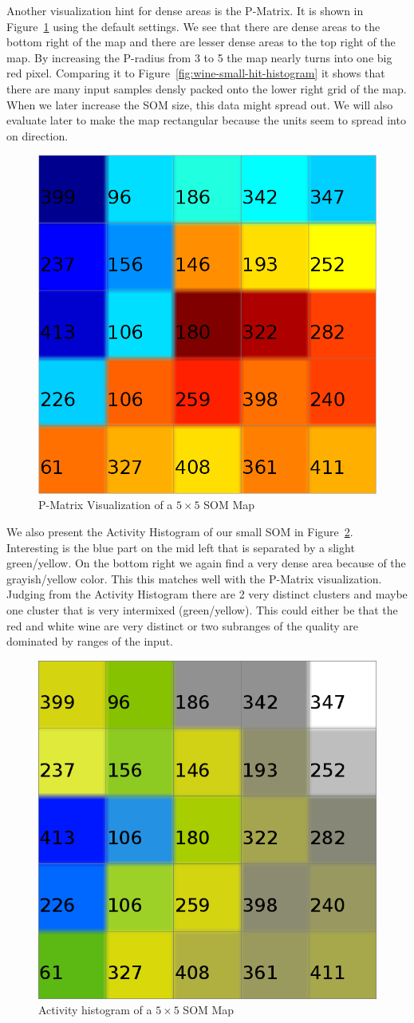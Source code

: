 \documentclass{acm_proc_article-sp}
\begin{document}
Another visualization hint for dense areas is the P-Matrix. It is shown in Figure~\ref{fig:wine-small-p-matrix} using
the default settings. We see that there are dense areas to the bottom right of the map and there are lesser
dense areas to the top right of the map.
By increasing the P-radius from 3 to 5 the map nearly turns into one big red pixel.
Comparing it to Figure~\ref{fig:wine-small-hit-histogram} it shows that there are many input samples densly packed
onto the lower right grid of the map. When we later increase the SOM size, this data might spread out. We
will also evaluate later to make the map rectangular because the units seem to spread into on direction.

\begin{figure}
\centering
\includegraphics[width=0.5\linewidth]{img/wine-small-p-matrix}
\caption{P-Matrix Visualization of a $5\times5$ SOM Map}
\label{fig:wine-small-p-matrix}
\end{figure}

We also present the Activity Histogram of our small SOM in Figure~\ref{fig:wine-small-activity-histogram}.
Interesting is the blue part on the mid left that is separated by a slight green/yellow.
On the bottom right we again find a very dense area because of the grayish/yellow color. This this matches
well with the P-Matrix visualization. Judging from the Activity Histogram there are 2 very distinct clusters
and maybe one cluster that is very intermixed (green/yellow). This could either be that the
red and white wine are very distinct or two subranges of the quality are dominated by ranges of the input.

\begin{figure}
\centering
\includegraphics[width=0.5\linewidth]{img/wine-small-activity-histogram}
\caption{Activity histogram of a $5\times5$ SOM Map}
\label{fig:wine-small-activity-histogram}
\end{figure}
\end{document}
